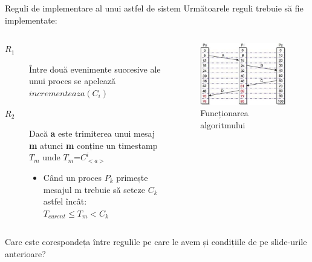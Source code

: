 \documentclass[9pt]{beamer}
\begin{document}
\begin{frame}{Reguli de implementare al unui astfel de sistem}
Următoarele reguli trebuie să fie implementate:
    \begin{columns}
        \begin{column}[c]{0.70\textwidth}
            \begin{description}
            \item[$R_1$] Între două evenimente succesive ale unui proces se apelează $incrementeaza(C_i)$
            \vskip5pt
            \item[$R_2$] Dacă \textbf{a} este trimiterea unui mesaj \textbf{m} atunci \textbf{m} conține un timestamp $T_m$ unde $T_m$=$C^i_{<a>}$
            \begin{itemize}
            \vskip5pt
            \item Când un proces $P_k$ primește mesajul m trebuie să seteze $C_k$ astfel încât:\\ $T_{curent} \leq T_m< C_k$
            \end{itemize}
            \end{description}
        \end{column}
        
        \begin{column}[c]{0.50\textwidth}
            \begin{figure}
            \includegraphics[scale=0.4]{figures/happen3}
            \caption{Funcționarea algoritmului}
            \end{figure}
        \end{column}
    \end{columns}
\vskip10pt
\centering
\Large{Care este corespondeța între regulile pe care le avem și condițiile de pe slide-urile anterioare?}
\end{frame}
\end{document}
